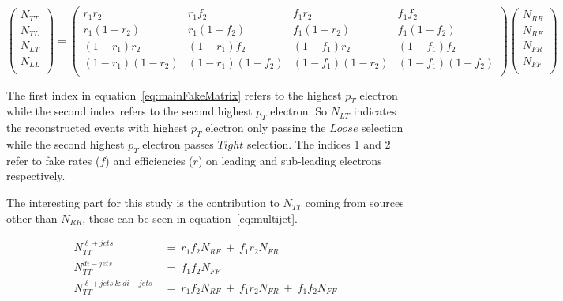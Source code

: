 \begin{equation} \label{eq:mainFakeMatrix}
   \begin{pmatrix}
      N_{TT} \\
      N_{TL} \\
      N_{LT} \\
      N_{LL} \\
   \end{pmatrix}
   =
   \begin{pmatrix}
      r_{1}r_{2} & r_{1}f_{2} & f_{1}r_{2} & f_{1}f_{2} \\
      r_{1}(1-r_{2}) & r_{1}(1-f_{2}) & f_{1}(1-r_{2}) & f_{1}(1-f_{2}) \\
      (1-r_{1})r_{2} & (1-r_{1})f_{2} & (1-f_{1})r_{2} & (1-f_{1})f_{2} \\
      (1-r_{1})(1-r_{2}) & (1-r_{1})(1-f_{2}) & (1-f_{1})(1-r_{2}) & (1-f_{1})(1-f_{2}) \\
   \end{pmatrix}
   \begin{pmatrix}
      N_{RR} \\
      N_{RF} \\
      N_{FR} \\
      N_{FF} \\
   \end{pmatrix}
\end{equation}

The first index in equation~\ref{eq:mainFakeMatrix} refers to the highest $p_{T}$ electron while the second index refers to the second highest $p_{T}$ electron. So $N_{LT}$ indicates the reconstructed events with highest $p_{T}$ electron only passing the $Loose$ selection while the second highest $p_{T}$ electron passes $Tight$ selection. The indices 1 and 2 refer to fake rates ($f$) and efficiencies ($r$) on leading and sub-leading electrons respectively.

The interesting part for this study is the contribution to $N_{TT}$ coming from sources other than $N_{RR}$, these can be seen in equation~\ref{eq:multijet}.

\begin{align} \label{eq:multijet}
   N^{\ell+jets}_{TT}~&=~r_{1}f_{2}N_{RF}~+~f_{1}r_{2}N_{FR} \nonumber \\
   N^{di-jets}_{TT}~&=~f_{1}f_{2}N_{FF} \nonumber \\
   N^{\ell+jets~\&~di-jets}_{TT}~&=~r_{1}f_{2}N_{RF}~+~f_{1}r_{2}N_{FR}~+~f_{1}f_{2}N_{FF} 
\end{align}

